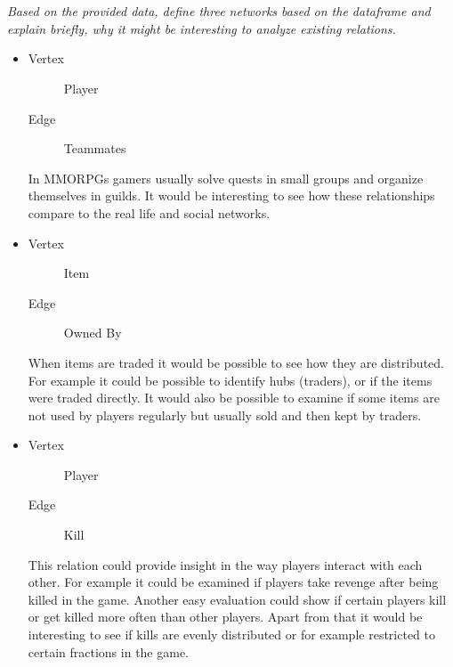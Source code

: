 \documentclass{article}\usepackage[]{graphicx}\usepackage[]{color}
\begin{document}
\section{}
\emph{Based on the provided data, define three networks
based on the dataframe and explain briefly, why 
it might be interesting to analyze existing relations.}
\begin{itemize}
\item
\begin{description}
\item[Vertex]Player
\item[Edge]Teammates
\end{description}
In MMORPGs gamers usually solve quests in small groups and organize themselves in guilds. It would be interesting to see how these relationships compare to the real life and social networks.

\item
\begin{description}
\item[Vertex] Item
\item[Edge] Owned By
\end{description}
When items are traded it would be possible to see how they are distributed. For example it could be possible to identify hubs (traders), or if the items were traded directly. It would also be possible to examine if some items are not used by players regularly but usually sold and then kept by traders. 
\item
\begin{description}
\item[Vertex] Player
\item[Edge] Kill
\end{description}
This relation could provide insight in the way players interact with each other. For example it could be examined if players take revenge after being killed in the game. Another easy evaluation could show if certain players kill or get killed more often than other players. Apart from that it would be interesting to see if kills are evenly distributed or for example restricted to certain fractions in the game.
\end{itemize}
\end{document}
